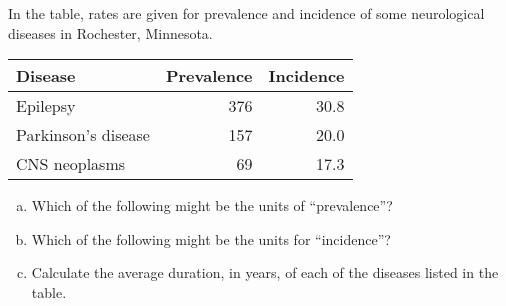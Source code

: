
In the table, rates are given for prevalence and incidence of some
neurological diseases in Rochester, Minnesota.

\begin{center}
\begin{tabular}{lrr}
Disease & Prevalence & Incidence\\\hline
Epilepsy & 376 & 30.8\\
Parkinson's disease & 157 & 20.0\\
CNS neoplasms & 69 & 17.3\\
\end{tabular}
\end{center}

\begin{enumerate}[(a)]
\item Which of the following might be the units of ``prevalence''?
\begin{MultipleChoice}
\end{MultipleChoice}

\item Which of the following might be the units for ``incidence''?
\begin{MultipleChoice}
\end{MultipleChoice}

\item Calculate the average duration, in years, of each of the diseases
listed in the table.
\answerSpace{.7in}
\end{enumerate}


